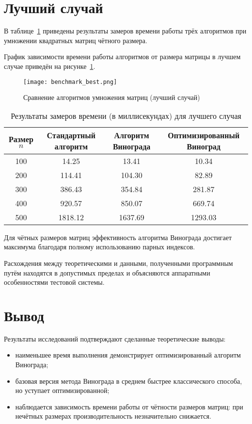 \section{Лучший случай}

В таблице~\ref{tab:best} приведены результаты замеров времени работы трёх алгоритмов при умножении квадратных матриц чётного размера.

График зависимости времени работы алгоритмов от размера матрицы в лучшем случае приведён на рисунке~\ref{fig:best}.

\begin{figure}[H]
	\centering
	\texttt{[image: benchmark\_best.png]}
	\caption{Сравнение алгоритмов умножения матриц (лучший случай)}
	\label{fig:best}
\end{figure}

\begin{table}[H]
	\centering
	\caption{Результаты замеров времени (в миллисекундах) для лучшего случая}
	\label{tab:best}
	\begin{tabular}{|c|c|c|c|}
		\hline
		Размер $n$ & Стандартный алгоритм & Алгоритм Винограда & Оптимизированный Виноград \\
		\hline
		100 & 14.25 & 13.41 & 10.34 \\
		200 & 114.41 & 104.30 & 82.89 \\
		300 & 386.43 & 354.84 & 281.87 \\
		400 & 920.57 & 850.07 & 669.74 \\
		500 & 1818.12 & 1637.69 & 1293.03 \\
		\hline
	\end{tabular}
\end{table}

Для чётных размеров матриц эффективность алгоритма Винограда достигает максимума благодаря полному использованию парных индексов.

Расхождения между теоретическими и данными, полученными программным путём находятся в допустимых пределах и объясняются аппаратными особенностями тестовой системы.


\section*{Вывод}

Результаты исследований подтверждают сделанные теоретические выводы:
\begin{itemize}
	\item наименьшее время выполнения демонстрирует оптимизированный алгоритм Винограда;
	\item базовая версия метода Винограда в среднем быстрее классического способа, но уступает оптимизированной;
	\item наблюдается зависимость времени работы от чётности размеров матриц: при нечётных размерах производительность незначительно снижается.
\end{itemize}

\clearpage
